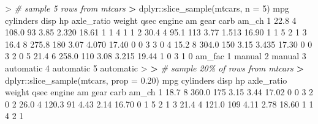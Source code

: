 \documentclass[
]{book}
\newenvironment{Shaded}{\begin{snugshade}}{\end{snugshade}}
\newcommand{\AttributeTok}[1]{\textcolor[rgb]{0.77,0.63,0.00}{#1}}
\newcommand{\CommentTok}[1]{\textcolor[rgb]{0.56,0.35,0.01}{\textit{#1}}}
\newcommand{\DecValTok}[1]{\textcolor[rgb]{0.00,0.00,0.81}{#1}}
\newcommand{\ErrorTok}[1]{\textcolor[rgb]{0.64,0.00,0.00}{\textbf{#1}}}
\newcommand{\FloatTok}[1]{\textcolor[rgb]{0.00,0.00,0.81}{#1}}
\newcommand{\FunctionTok}[1]{\textcolor[rgb]{0.00,0.00,0.00}{#1}}
\newcommand{\NormalTok}[1]{#1}
\newcommand{\SpecialCharTok}[1]{\textcolor[rgb]{0.00,0.00,0.00}{#1}}
\begin{document}
\begin{Shaded}
\begin{Highlighting}[]
\SpecialCharTok{\textgreater{}} \CommentTok{\# sample 5 rows from mtcars}
\ErrorTok{\textgreater{}}\NormalTok{ dplyr}\SpecialCharTok{::}\FunctionTok{slice\_sample}\NormalTok{(mtcars, }\AttributeTok{n =} \DecValTok{5}\NormalTok{)}
\NormalTok{   mpg cylinders  disp  hp axle\_ratio weight  qsec engine am gear carb am\_ch}
\DecValTok{1} \FloatTok{22.8}         \DecValTok{4} \FloatTok{108.0}  \DecValTok{93}       \FloatTok{3.85}  \FloatTok{2.320} \FloatTok{18.61}      \DecValTok{1}  \DecValTok{1}    \DecValTok{4}    \DecValTok{1}     \DecValTok{1}
\DecValTok{2} \FloatTok{30.4}         \DecValTok{4}  \FloatTok{95.1} \DecValTok{113}       \FloatTok{3.77}  \FloatTok{1.513} \FloatTok{16.90}      \DecValTok{1}  \DecValTok{1}    \DecValTok{5}    \DecValTok{2}     \DecValTok{1}
\DecValTok{3} \FloatTok{16.4}         \DecValTok{8} \FloatTok{275.8} \DecValTok{180}       \FloatTok{3.07}  \FloatTok{4.070} \FloatTok{17.40}      \DecValTok{0}  \DecValTok{0}    \DecValTok{3}    \DecValTok{3}     \DecValTok{0}
\DecValTok{4} \FloatTok{15.2}         \DecValTok{8} \FloatTok{304.0} \DecValTok{150}       \FloatTok{3.15}  \FloatTok{3.435} \FloatTok{17.30}      \DecValTok{0}  \DecValTok{0}    \DecValTok{3}    \DecValTok{2}     \DecValTok{0}
\DecValTok{5} \FloatTok{21.4}         \DecValTok{6} \FloatTok{258.0} \DecValTok{110}       \FloatTok{3.08}  \FloatTok{3.215} \FloatTok{19.44}      \DecValTok{1}  \DecValTok{0}    \DecValTok{3}    \DecValTok{1}     \DecValTok{0}
\NormalTok{     am\_fac}
\DecValTok{1}\NormalTok{    manual}
\DecValTok{2}\NormalTok{    manual}
\DecValTok{3}\NormalTok{ automatic}
\DecValTok{4}\NormalTok{ automatic}
\DecValTok{5}\NormalTok{ automatic}
\SpecialCharTok{\textgreater{}} 
\ErrorTok{\textgreater{}} \CommentTok{\# sample 20\% of rows from mtcars}
\ErrorTok{\textgreater{}}\NormalTok{ dplyr}\SpecialCharTok{::}\FunctionTok{slice\_sample}\NormalTok{(mtcars, }\AttributeTok{prop =} \FloatTok{0.20}\NormalTok{)}
\NormalTok{   mpg cylinders  disp  hp axle\_ratio weight  qsec engine am gear carb am\_ch}
\DecValTok{1} \FloatTok{18.7}         \DecValTok{8} \FloatTok{360.0} \DecValTok{175}       \FloatTok{3.15}   \FloatTok{3.44} \FloatTok{17.02}      \DecValTok{0}  \DecValTok{0}    \DecValTok{3}    \DecValTok{2}     \DecValTok{0}
\DecValTok{2} \FloatTok{26.0}         \DecValTok{4} \FloatTok{120.3}  \DecValTok{91}       \FloatTok{4.43}   \FloatTok{2.14} \FloatTok{16.70}      \DecValTok{0}  \DecValTok{1}    \DecValTok{5}    \DecValTok{2}     \DecValTok{1}
\DecValTok{3} \FloatTok{21.4}         \DecValTok{4} \FloatTok{121.0} \DecValTok{109}       \FloatTok{4.11}   \FloatTok{2.78} \FloatTok{18.60}      \DecValTok{1}  \DecValTok{1}    \DecValTok{4}    \DecValTok{2}     \DecValTok{1}

\end{Highlighting}
\end{Shaded}
\end{document}
